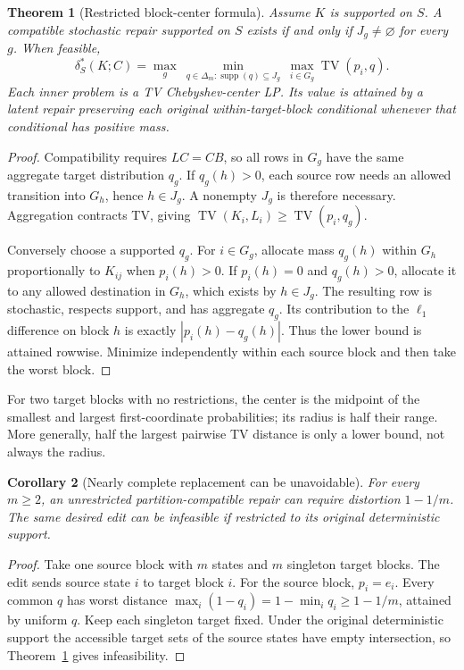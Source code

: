 \documentclass[11pt,letterpaper]{article}
\newtheorem{theorem}{Theorem}
\newtheorem{corollary}[theorem]{Corollary}
\newcommand{\TV}{\operatorname{TV}}
\newcommand{\D}{\Delta}
\begin{document}
\begin{theorem}[Restricted block-center formula]\label{thm:center}
Assume $K$ is supported on $S$. A compatible stochastic repair supported on $S$ exists if and only if $J_g\ne\varnothing$ for every $g$. When feasible,
\begin{equation}
\delta^*_S(K;C)=\max_g\ \min_{q\in\D_m:\operatorname{supp}(q)\subseteq J_g}\ \max_{i\in G_g}\TV(p_i,q).\label{eq:center}
\end{equation}
Each inner problem is a TV Chebyshev-center LP. Its value is attained by a latent repair preserving each original within-target-block conditional whenever that conditional has positive mass.
\end{theorem}
\begin{proof}
Compatibility requires $LC=CB$, so all rows in $G_g$ have the same aggregate target distribution $q_g$. If $q_g(h)>0$, each source row needs an allowed transition into $G_h$, hence $h\in J_g$. A nonempty $J_g$ is therefore necessary. Aggregation contracts TV, giving $\TV(K_i,L_i)\ge\TV(p_i,q_g)$.

Conversely choose a supported $q_g$. For $i\in G_g$, allocate mass $q_g(h)$ within $G_h$ proportionally to $K_{ij}$ when $p_i(h)>0$. If $p_i(h)=0$ and $q_g(h)>0$, allocate it to any allowed destination in $G_h$, which exists by $h\in J_g$. The resulting row is stochastic, respects support, and has aggregate $q_g$. Its contribution to the $\ell_1$ difference on block $h$ is exactly $|p_i(h)-q_g(h)|$. Thus the lower bound is attained rowwise. Minimize independently within each source block and then take the worst block.
\end{proof}

For two target blocks with no restrictions, the center is the midpoint of the smallest and largest first-coordinate probabilities; its radius is half their range. More generally, half the largest pairwise TV distance is only a lower bound, not always the radius.

\begin{corollary}[Nearly complete replacement can be unavoidable]\label{cor:branch}
For every $m\ge2$, an unrestricted partition-compatible repair can require distortion $1-1/m$. The same desired edit can be infeasible if restricted to its original deterministic support.
\end{corollary}
\begin{proof}
Take one source block with $m$ states and $m$ singleton target blocks. The edit sends source state $i$ to target block $i$. For the source block, $p_i=e_i$. Every common $q$ has worst distance $\max_i(1-q_i)=1-\min_i q_i\ge1-1/m$, attained by uniform $q$. Keep each singleton target fixed. Under the original deterministic support the accessible target sets of the source states have empty intersection, so Theorem~\ref{thm:center} gives infeasibility.
\end{proof}
\end{document}
